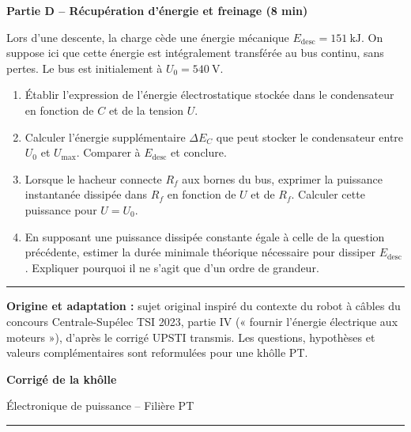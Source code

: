 \documentclass[11pt,a4paper]{article}
\newcommand{\partie}[1]{\vspace{0.7em}\noindent\textbf{\large #1}\par\vspace{0.25em}}
\begin{document}
\partie{Partie D -- Récupération d'énergie et freinage (8 min)}
Lors d'une descente, la charge cède une énergie mécanique $E_{\mathrm{desc}}=\SI{151}{\kilo\joule}$. On suppose ici que cette énergie est intégralement transférée au bus continu, sans pertes. Le bus est initialement à $U_0=\SI{540}{\volt}$.
\begin{enumerate}[label=\textbf{D\arabic*.}]
\item Établir l'expression de l'énergie électrostatique stockée dans le condensateur en fonction de $C$ et de la tension $U$.
\item Calculer l'énergie supplémentaire $\Delta E_C$ que peut stocker le condensateur entre $U_0$ et $U_{\max}$. Comparer à $E_{\mathrm{desc}}$ et conclure.
\item Lorsque le hacheur connecte $R_f$ aux bornes du bus, exprimer la puissance instantanée dissipée dans $R_f$ en fonction de $U$ et de $R_f$. Calculer cette puissance pour $U=U_0$.
\item En supposant une puissance dissipée constante égale à celle de la question précédente, estimer la durée minimale théorique nécessaire pour dissiper $E_{\mathrm{desc}}$. Expliquer pourquoi il ne s'agit que d'un ordre de grandeur.
\end{enumerate}

\vfill
\hrule\vspace{0.35em}
{\footnotesize\textbf{Origine et adaptation :} sujet original inspiré du contexte du robot à câbles du concours Centrale-Supélec TSI 2023, partie IV (« fournir l'énergie électrique aux moteurs »), d'après le corrigé UPSTI transmis. Les questions, hypothèses et valeurs complémentaires sont reformulées pour une khôlle PT.}


\clearpage
\begin{center}
{\Large\bfseries Corrigé de la khôlle}\par\smallskip
{\large Électronique de puissance -- Filière PT}
\end{center}
\hrule\vspace{0.7em}
\end{document}
